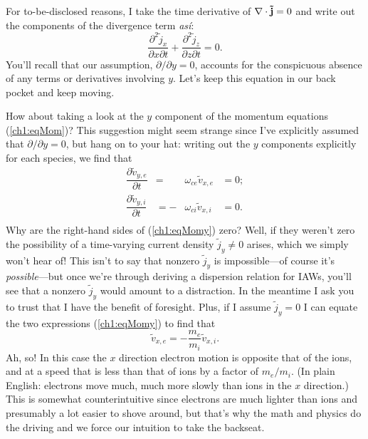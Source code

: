 For to-be-disclosed reasons, I take the time derivative of ${\bf \nabla} \cdot
\mathbf{\tilde j} = 0$ and write out the components of the divergence term
\emph{as\'{i}}:
\begin{equation} 
  \label{ch1:eqCont2} \dfrac{\partial^2 \tilde j_x}{\partial x \partial t} + \dfrac{\partial^2 \tilde j_z}{\partial z \partial t} = 0.
\end{equation}
You'll recall that our assumption, $\partial / \partial y = 0$, accounts for the
conspicuous absence of any terms or derivatives involving $y$. Let's keep this
equation in our back pocket and keep moving.

How about taking a look at the $y$ component of the momentum equations
(\ref{ch1:eqMom})? This suggestion might seem strange since I've explicitly
assumed that $\partial / \partial y = 0$, but hang on to your hat: writing out
the $y$ components explicitly for each species, we find that
\begin{equation} 
  \begin{alignedat}{2}
    \label{ch1:eqMomy} \dfrac{\partial \tilde v_{y,e}}{\partial t} &=
    &\omega_{ce} \tilde v_{x,e} &= 0; \\
    \dfrac{\partial \tilde v_{y,i}}{\partial t} &=
    - &\omega_{ci} \tilde v_{x,i} &= 0. \\
  \end{alignedat}
\end{equation}
Why are the right-hand sides of (\ref{ch1:eqMomy}) zero?  Well, if they weren't
zero the possibility of a time-varying current density $\tilde j_y \neq 0$
arises, which we simply won't hear of! This isn't to say that nonzero
$\tilde j_y$ is impossible---of course it's \emph{possible}---but once we're
through deriving a dispersion relation for IAWs, you'll see that
a nonzero $\tilde j_y$ would amount to a distraction. In the meantime I ask you
to trust that I have the benefit of foresight. Plus, if I assume
$\tilde j_y = 0$ I can equate the two expressions (\ref{ch1:eqMomy}) to find
that
\begin{equation} 
  \tilde v_{x,e} = - \dfrac{m_e}{m_i} \tilde v_{x,i}.
\end{equation}
Ah, so! In this case the $x$ direction electron motion is opposite that of the
ions, and at a speed that is less than that of ions by a factor of $m_e /
m_i$.
(In plain English: electrons move much, much more slowly than ions in the $x$
direction.) This is somewhat counterintuitive since electrons are much lighter
than ions and presumably a lot easier to shove around, but that's why the math
and physics do the driving and we force our intuition to take the backseat.

